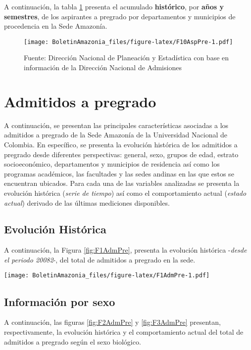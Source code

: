 \documentclass[
]{book}
\begin{document}
A continuación, la tabla \ref{fig:F10AspPre} presenta el acumulado \textbf{histórico}, por \textbf{años y semestres}, de los aspirantes a pregrado por departamentos y municipios de procedencia en la Sede Amazonía.

\begin{figure}
\centering
\texttt{[image: BoletinAmazonia\_files/figure-latex/F10AspPre-1.pdf]}
\caption{\label{fig:F10AspPre}Fuente: Dirección Nacional de Planeación y Estadística con base en información de la Dirección Nacional de Admisiones}
\end{figure}

\hypertarget{AdmPre}{%
\section{Admitidos a pregrado}\label{AdmPre}}

A continuación, se presentan las principales características asociadas a los admitidos a pregrado de la Sede Amazonía de la Universidad Nacional de Colombia. En específico, se presenta la evolución histórica de los admitidos a pregrado desde diferentes perspectivas: general, sexo, grupos de edad, estrato socioeconómico, departamentos y municipios de residencia así como los programas académicos, las facultades y las sedes andinas en las que estos se encuentran ubicados. Para cada una de las variables analizadas se presenta la evolución histórica (\emph{serie de tiempo}) así como el comportamiento actual (\emph{estado actual}) derivado de las últimas mediciones disponibles.

\hypertarget{evoluciuxf3n-histuxf3rica-1}{%
\subsection{Evolución Histórica}\label{evoluciuxf3n-histuxf3rica-1}}

A continuación, la Figura \ref{fig:F1AdmPre}, presenta la evolución histórica -\emph{desde el periodo 20082}-, del total de admitidos a pregrado en la sede.

\texttt{[image: BoletinAmazonia\_files/figure-latex/F1AdmPre-1.pdf]}

\hypertarget{informaciuxf3n-por-sexo-1}{%
\subsection{Información por sexo}\label{informaciuxf3n-por-sexo-1}}

A continuación, las figuras \ref{fig:F2AdmPre} y \ref{fig:F3AdmPre} presentan, respectivamente, la evolución histórica y el comportamiento actual del total de admitidos a pregrado según el sexo biológico.
\end{document}
